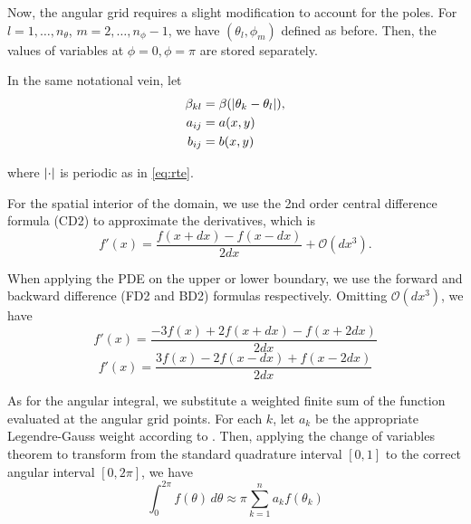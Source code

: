 Now, the angular grid requires a slight modification to account for the poles.
For $l = 1, \ldots, n_{\theta}$, $m = 2, \ldots, n_{\phi}-1$, we have
$(\theta_l, \phi_m)$ defined as before. Then, the values of variables at
$\phi=0, \phi=\pi$ are stored separately.


In the same notational vein, let \\[-1em]
\begin{align}
    \beta_{kl} &= \beta(\left| \theta_k-\theta_l \right|), \\
    a_{ij} &= a(x,y) \\
    b_{ij} &= b(x,y)
\end{align}

where $\left| \cdot \right|$ is periodic as in \eqref{eq:rte}.

For the spatial interior of the domain, we use the 2nd order central difference formula (CD2) to approximate the derivatives, which is
\begin{equation}
    \tag{CD2}
    f'(x) = \frac{f(x+dx)-f(x-dx)}{2dx} + \mathcal{O}(dx^3).
\end{equation}

When applying the PDE on the upper or lower boundary, we use the forward and backward difference (FD2 and BD2) formulas respectively.
Omitting $\mathcal{O}(dx^3)$, we have
\begin{equation}
    \tag{FD2}
    \label{eq:FD2}
    f'(x) = \frac{-3f(x)+2f(x+dx)-f(x+2dx)}{2dx}
\end{equation}
\begin{equation}
    \tag{BD2}
    \label{eq:BD2}
    f'(x) = \frac{3f(x)-2f(x-dx)+f(x-2dx)}{2dx}
\end{equation}

As for the angular integral, we substitute a weighted finite sum of the function evaluated at the angular grid points.
For each $k$, let $a_k$ be the appropriate Legendre-Gauss weight according to \cite[Chapter 2]{chandrasekhar_radiative_1960}.
Then, applying the change of variables theorem to transform from the standard quadrature interval $[0,1]$ to the correct angular interval $[0,2\pi]$, we have
\begin{equation}
    \tag{LG}
    \int_0^{2\pi} f(\theta)\,d\theta \approx \pi\sum_{k=1}^n a_k f(\theta_k)
\end{equation}

